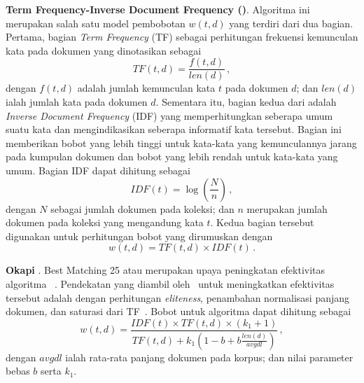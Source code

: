 \vspace{2mm}
\noindent\textbf{Term Frequency-Inverse Document Frequency (\tfidf{})}. Algoritma ini merupakan salah satu model pembobotan \(w(t,d)\) yang terdiri dari dua bagian. Pertama, bagian \textit{Term Frequency} (TF) sebagai perhitungan frekuensi kemunculan kata pada dokumen yang dinotasikan sebagai 
\[
TF(t,d)=\frac{f(t,d)}{len(d)} \, ,
\]
dengan \(f(t,d)\) adalah jumlah kemunculan kata $t$ pada dokumen $d$; dan $len(d)$ ialah jumlah kata pada dokumen $d$. Sementara itu, bagian kedua dari \tfidf{} adalah \textit{Inverse Document Frequency} (IDF) yang memperhitungkan seberapa umum suatu kata dan mengindikasikan seberapa informatif kata tersebut. Bagian ini memberikan bobot yang lebih tinggi untuk kata-kata yang kemunculannya jarang pada kumpulan dokumen dan bobot yang lebih rendah untuk kata-kata yang umum. Bagian IDF dapat dihitung sebagai
\[
IDF(t)= \log\left(\frac{N}{n}\right) \, ,
\]
dengan $N$ sebagai jumlah dokumen pada koleksi; dan $n$ merupakan jumlah dokumen pada koleksi yang mengandung kata $t$. Kedua bagian tersebut digunakan untuk perhitungan bobot \tfidf{} yang dirumuskan dengan
\[ 
w(t,d)=TF(t,d) \times IDF(t) \, . 
\]

\vspace{2mm}
\noindent\textbf{Okapi \obm{}}. Best Matching 25 atau \obm{} merupakan upaya peningkatan efektivitas algoritma \tfidf{}~\citep{schutze2008introduction}. Pendekatan yang diambil oleh~\citet{robertson1995okapi} untuk meningkatkan efektivitas tersebut adalah dengan perhitungan \textit{eliteness}, penambahan normalisasi panjang dokumen, dan saturasi dari TF~\citep{Robertson2009ThePR}. Bobot untuk algoritma \obm{} dapat dihitung sebagai
\[
w(t,d)=\frac{IDF(t) \times TF(t,d) \times (k_1 + 1)}{TF(t,d) + k_1 (1 - b + b \frac{len(d)}{avgdl})} \, ,
\]
dengan $avgdl$ ialah rata-rata panjang dokumen pada korpus; dan nilai parameter bebas $b$ serta $k_1$.


